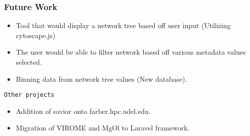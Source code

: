 \documentclass{beamer}
\begin{document}
\begin{frame}[fragile]
\frametitle{Future Work}


\begin{itemize}
\item Tool that would display a network tree based off user input (Utilizing cytoscape.js)
\item The user would be able to filter network based off various metadata values selected.
\item Binning data from network tree values (New database). 

\end{itemize}

\texttt{Other projects}
\begin{itemize}
\item Addition of savior onto farber.hpc.udel.edu.
\item Migration of VIROME and MgOl to Laravel framework. 
\end{itemize}

\end{frame}
\end{document}
